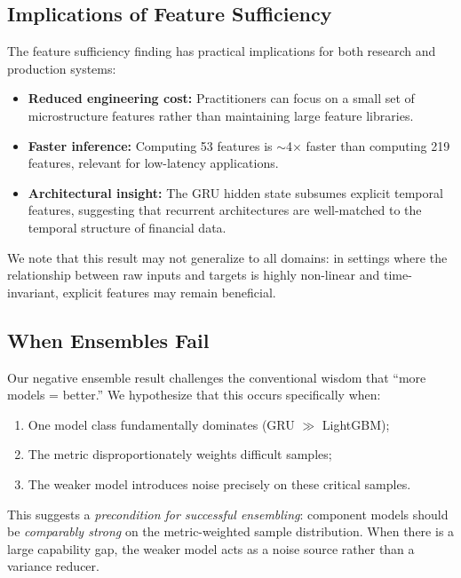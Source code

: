 \documentclass[11pt,a4paper]{article}
\begin{document}
\subsection{Implications of Feature Sufficiency}

The feature sufficiency finding has practical implications for both research and production systems:

\begin{itemize}[itemsep=0.2em]
    \item \textbf{Reduced engineering cost:} Practitioners can focus on a small set of microstructure features rather than maintaining large feature libraries.
    \item \textbf{Faster inference:} Computing 53 features is $\sim$4$\times$ faster than computing 219 features, relevant for low-latency applications.
    \item \textbf{Architectural insight:} The GRU hidden state subsumes explicit temporal features, suggesting that recurrent architectures are well-matched to the temporal structure of financial data.
\end{itemize}

We note that this result may not generalize to all domains: in settings where the relationship between raw inputs and targets is highly non-linear and time-invariant, explicit features may remain beneficial.

\subsection{When Ensembles Fail}

Our negative ensemble result challenges the conventional wisdom that ``more models = better.'' We hypothesize that this occurs specifically when:
\begin{enumerate}[itemsep=0.1em]
    \item One model class fundamentally dominates (GRU $\gg$ LightGBM);
    \item The metric disproportionately weights difficult samples;
    \item The weaker model introduces noise precisely on these critical samples.
\end{enumerate}

This suggests a \emph{precondition for successful ensembling}: component models should be \emph{comparably strong} on the metric-weighted sample distribution. When there is a large capability gap, the weaker model acts as a noise source rather than a variance reducer.
\end{document}
